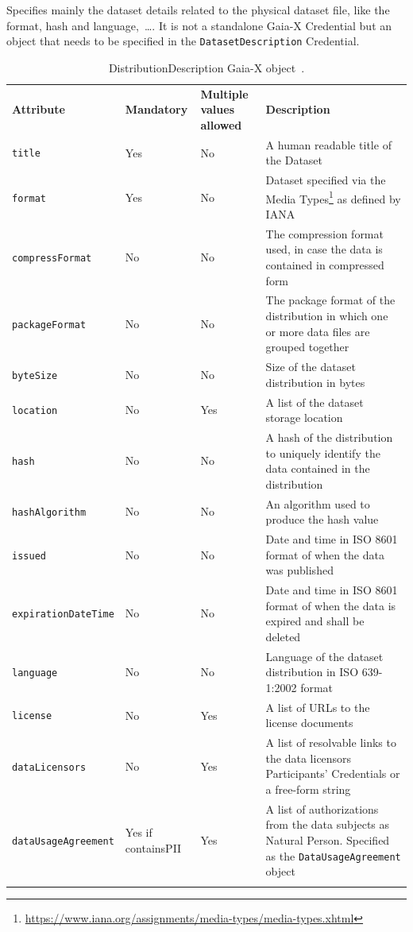 Specifies mainly the dataset details related to the physical dataset file, like the format, hash and language,~\ldots.
It is not a standalone Gaia-X Credential but an object that needs to be specified in the \texttt{DatasetDescription} Credential.

\begin{longtable}{ |p{4cm}|p{2cm}|p{2cm}|p{7cm}| }
    \hhline{----}
    \textbf{Attribute} & \textbf{Mandatory} & \textbf{Multiple values allowed} & \textbf{Description}\\
    \hhline{----}
    \texttt{title} & Yes & No & A human readable title of the Dataset\\
    \hhline{----}
    \texttt{format} & Yes & No & Dataset specified via the Media Types\footnote{\url{https://www.iana.org/assignments/media-types/media-types.xhtml}} as defined by IANA\\
    \hhline{----}
    \texttt{compressFormat} & No & No & The compression format used, in case the data is contained in compressed form\\
    \hhline{----}
    \texttt{packageFormat} & No & No & The package format of the distribution in which one or more data files are grouped together\\
    \hhline{----}
    \texttt{byteSize} & No & No & Size of the dataset distribution in bytes\\
    \hhline{----}
    \texttt{location} & No & Yes & A list of the dataset storage location\\
    \hhline{----}
    \texttt{hash} & No & No & A hash of the distribution to uniquely identify the data contained in the distribution\\
    \hhline{----}
    \texttt{hashAlgorithm} & No & No & An algorithm used to produce the hash value\\
    \hhline{----}
    \texttt{issued} & No & No & Date and time in ISO 8601 format of when the data was published\\
    \hhline{----}
    \texttt{expirationDateTime} & No & No & Date and time in ISO 8601 format of when the data is expired and shall be deleted\\
    \hhline{----}
    \texttt{language} & No & No & Language of the dataset distribution in ISO 639-1:2002 format\\
    \hhline{----}
    \texttt{license} & No & Yes & A list of URLs to the license documents\\
    \hhline{----}
    \texttt{dataLicensors} & No & Yes & A list of resolvable links to the data licensors Participants' Credentials or a free-form string\\
    \hhline{----}
    \texttt{dataUsageAgreement} & Yes if containsPII & Yes & A list of authorizations from the data subjects as Natural Person.
    Specified as the \texttt{DataUsageAgreement} object\\
    \hhline{----}
    \caption{DistributionDescription Gaia-X object~\cite{gaiax_data_exchange_document}.}
    \label{tab:distribution_description}
\end{longtable}

